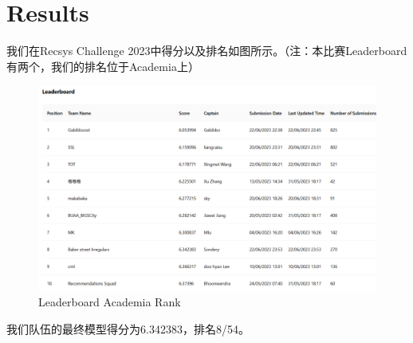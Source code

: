 \documentclass{article}
\begin{document}
\section{Results}
我们在Recsys Challenge 2023中得分以及排名如图所示。（注：本比赛Leaderboard有两个，我们的排名位于Academia上）

\begin{figure}[htbp]
  \centering
  \includegraphics[scale=0.3]{results.png}
  \caption{Leaderboard Academia Rank}
  \label{figure5}
\end{figure}

我们队伍的最终模型得分为6.342383，排名8/54。




\end{document}
